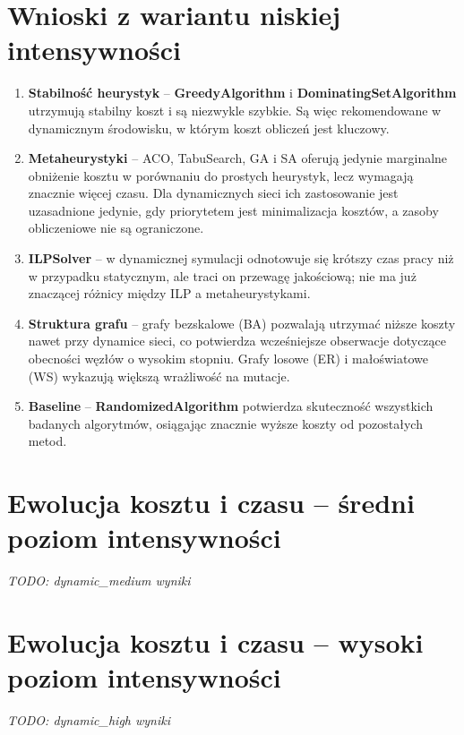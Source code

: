 \section{Wnioski z wariantu niskiej intensywności}

\begin{enumerate}
\item \textbf{Stabilność heurystyk} -- \textbf{GreedyAlgorithm} i \textbf{DominatingSetAlgorithm} utrzymują stabilny koszt i są niezwykle szybkie. Są więc rekomendowane w dynamicznym środowisku, w którym koszt obliczeń jest kluczowy.

\item \textbf{Metaheurystyki} -- ACO, TabuSearch, GA i SA oferują jedynie marginalne obniżenie kosztu w porównaniu do prostych heurystyk, lecz wymagają znacznie więcej czasu. Dla dynamicznych sieci ich zastosowanie jest uzasadnione jedynie, gdy priorytetem jest minimalizacja kosztów, a zasoby obliczeniowe nie są ograniczone.

\item \textbf{ILPSolver} -- w dynamicznej symulacji odnotowuje się krótszy czas pracy niż w przypadku statycznym, ale traci on przewagę jakościową; nie ma już znaczącej różnicy między ILP a metaheurystykami.

\item \textbf{Struktura grafu} -- grafy bezskalowe (BA) pozwalają utrzymać niższe koszty nawet przy dynamice sieci, co potwierdza wcześniejsze obserwacje dotyczące obecności węzłów o wysokim stopniu. Grafy losowe (ER) i małoświatowe (WS) wykazują większą wrażliwość na mutacje.

\item \textbf{Baseline} -- \textbf{RandomizedAlgorithm} potwierdza skuteczność wszystkich badanych algorytmów, osiągając znacznie wyższe koszty od pozostałych metod.
\end{enumerate}

\section{Ewolucja kosztu i czasu -- średni poziom intensywności}

\emph{TODO: dynamic\_medium wyniki}

\section{Ewolucja kosztu i czasu -- wysoki poziom intensywności}

\emph{TODO: dynamic\_high wyniki}

